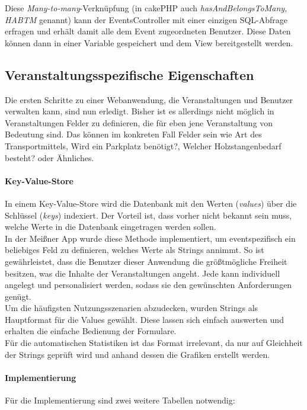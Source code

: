 Diese \emph{Many-to-many}-Verknüpfung (in cakePHP auch \emph{hasAndBelongsToMany, HABTM} genannt) kann der EventsController mit einer einzigen SQL-Abfrage erfragen und erhält damit alle dem Event zugeordneten Benutzer. Diese Daten können dann in einer Variable gespeichert und dem View bereitgestellt werden.

\subsection{Veranstaltungsspezifische Eigenschaften}
Die ersten Schritte zu einer Webanwendung, die Veranstaltungen und Benutzer verwalten kann, sind nun erledigt. Bisher ist es allerdings nicht möglich in Veranstaltungen Felder zu definieren, die für eben jene Veranstaltung von Bedeutung sind. Das können im konkreten Fall Felder sein wie \glqq Art des Transportmittels\grqq{}, \glqq Wird ein Parkplatz benötigt?\grqq{}, \glqq Welcher Holzstangenbedarf besteht?\grqq{} oder Ähnliches.

\paragraph{Key-Value-Store} In einem Key-Value-Store wird die Datenbank mit den Werten (\emph{values}) über die Schlüssel (\emph{keys}) indexiert. Der Vorteil ist, dass vorher nicht bekannt sein muss, welche Werte in die Datenbank eingetragen werden sollen.\\
In der Meißner App wurde diese Methode implementiert, um eventspezifisch ein beliebiges Feld zu definieren, welches Werte als Strings annimmt. So ist gewährleistet, dass die Benutzer dieser Anwendung die größtmögliche Freiheit besitzen, was die Inhalte der Veranstaltungen angeht. Jede kann individuell angelegt und personalisiert werden, sodass sie den gewünschten Anforderungen genügt.\\
Um die häufigsten Nutzungsszenarien abzudecken, wurden Strings als Hauptformat für die Values gewählt. Diese lassen sich einfach auswerten und erhalten die einfache Bedienung der Formulare.\\
Für die automatischen Statistiken ist das Format irrelevant, da nur auf Gleichheit der Strings geprüft wird und anhand dessen die Grafiken erstellt werden. 

\paragraph{Implementierung}
Für die Implementierung sind zwei weitere Tabellen notwendig: 

